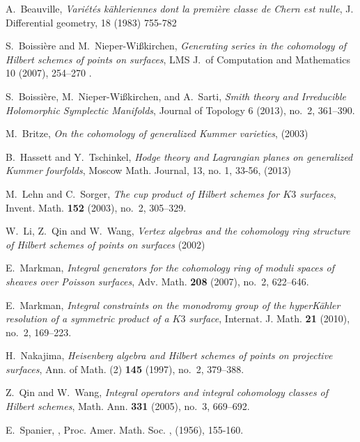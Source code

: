 \documentclass{amsart}
\theoremstyle{plain}
\theoremstyle{definition}
\theoremstyle{remark}
\begin{document}

\begin{thebibliography}{10}

A.~Beauville, \emph{Variétés kähleriennes dont la première classe de Chern est nulle}, 
  J. Differential geometry, 18 (1983) 755-782

S.~Boissi\`ere and M.~Nieper-Wi{\ss}kirchen, \emph{Generating series in the cohomology 
  of Hilbert schemes of points on surfaces}, LMS J.~of Computation and Mathematics 10 (2007), 254--270 .

S.~Boissi\`ere, M.~Nieper-Wi{\ss}kirchen, and A.~Sarti, \emph{Smith theory and 
  Irreducible Holomorphic Symplectic Manifolds}, Journal of Topology 6 (2013), no.~2, 361–390.

M.~Britze, \emph{On the cohomology of generalized Kummer varieties}, (2003) 

B.~Hassett and Y.~Tschinkel, \emph{ Hodge theory and Lagrangian planes on 
  generalized Kummer fourfolds}, Moscow Math. Journal, 13, no. 1, 33-56, (2013) 
  
M.~Lehn and C.~Sorger, \emph{The cup product of {H}ilbert schemes for {$K3$}
  surfaces}, Invent. Math. \textbf{152} (2003), no.~2, 305--329.

W.~Li, Z.~Qin and W.~Wang, \emph{Vertex algebras and the cohomology ring structure of 
  Hilbert schemes of points on surfaces} (2002)

E.~Markman, \emph{Integral generators for the cohomology ring of moduli spaces of
  sheaves over {P}oisson surfaces}, Adv. Math. \textbf{208} (2007), no.~2,
  622--646.

E.~Markman, \emph{Integral constraints on the monodromy group of the
  hyper{K}\"ahler resolution of a symmetric product of a {$K3$} surface},
  Internat. J. Math. \textbf{21} (2010), no.~2, 169--223.

H.~Nakajima, \emph{Heisenberg algebra and {H}ilbert schemes of points on
  projective surfaces}, Ann. of Math. (2) \textbf{145} (1997), no.~2, 379--388.

Z.~Qin and W.~Wang, \emph{Integral operators and integral cohomology classes of
  {H}ilbert schemes}, Math. Ann. \textbf{331} (2005), no.~3, 669--692.

E.~Spanier, 
,
\newblock Proc. Amer. Math. Soc.
, (1956), 155-160.

\end{thebibliography}
\end{document}
